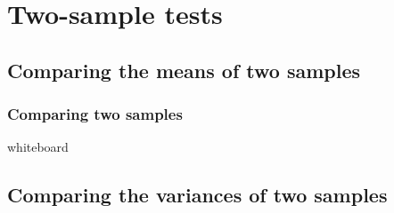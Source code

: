 \documentclass[t]{beamer} %
\begin{document}
\section{Two-sample tests}

\subsection{Comparing the means of two samples}

\begin{frame}[c]
  \frametitle{Comparing two samples}
  
  \begin{center}
    \huge \hand{} whiteboard
  \end{center}
\end{frame}

\begin{frame}
  \frametitle{}

\end{frame}

\begin{frame}
  \frametitle{}

\end{frame}

\begin{frame}[fragile]
  \frametitle{}

  \begin{alltt}
  \end{alltt}
\end{frame}

\subsection{Comparing the variances of two samples}

\begin{frame}
  \frametitle{}

\end{frame}

\begin{frame}[fragile]
  \frametitle{}

  \begin{alltt}
  \end{alltt}
\end{frame}
\end{document}
